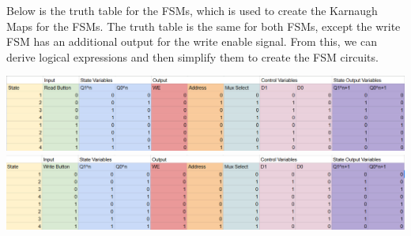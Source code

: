 \documentclass{article}
\begin{document}
        Below is the truth table for the FSMs, which is used to create the Karnaugh Maps for the FSMs. The truth table is the same for both FSMs, except the write FSM has an additional output for the write enable signal.    
        From this, we can derive logical expressions and then simplify them to create the FSM circuits.\\
        \begin{minipage}{\textwidth}
            \begin{center}
            \includegraphics[width=1.2\textwidth]{READ_Truth_Table.png}
            \includegraphics[width=1.2\textwidth]{WRITE_Truth_Table.png}
            \end{center}
        \end{minipage}
\end{document}

